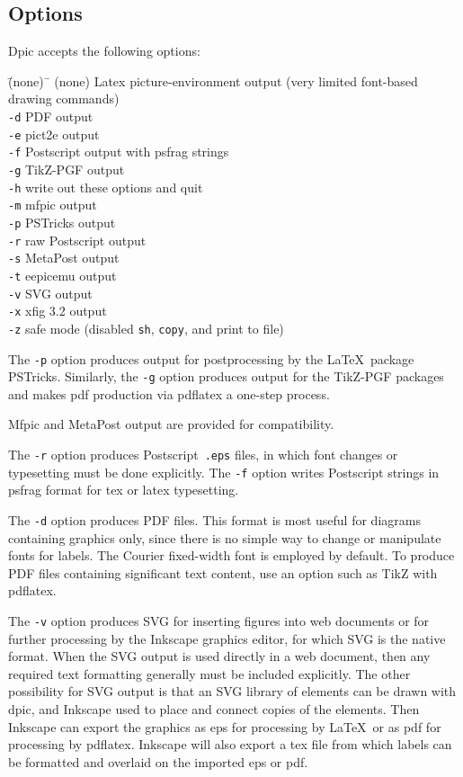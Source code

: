 \documentclass[11pt]{article}
\newcommand{\bq}{}
\newcommand{\Dpic}{{\bq Dpic}\xspace}
\newcommand{\PSTricks}{{\bq PSTricks}\xspace}
\newcommand{\MetaPost}{{\bq MetaPost}\xspace}
\newcommand{\Postscript}{{\bq Postscript}\xspace}
\begin{document}
\subsection{Options}
\Dpic accepts the following options:
\begin{tabbing}
\quad\=\hbox{(none)\ }\= \kill
\> (none) \> Latex picture-environment output (very limited font-based
 drawing commands)\\
\> {\tt -d} \> PDF output \\
\> {\tt -e} \> pict2e output \\
\> {\tt -f} \> Postscript output with psfrag strings \\
\> {\tt -g} \> TikZ-PGF output \\
\> {\tt -h} \> write out these options and quit \\
\> {\tt -m} \> mfpic output \\
\> {\tt -p} \> PSTricks output \\
\> {\tt -r} \> raw Postscript output \\
\> {\tt -s} \> MetaPost output \\
\> {\tt -t} \> eepicemu output \\
\> {\tt -v} \> SVG output \\
\> {\tt -x} \> xfig 3.2 output \\
\> {\tt -z} \> safe mode (disabled {\tt sh}, {\tt copy}, and print to file)
\end{tabbing}

The {\tt -p} option produces output for postprocessing by the
\LaTeX\ package \PSTricks.
Similarly, the {\tt -g} option produces output
for the TikZ-PGF packages and makes pdf production
via pdflatex a one-step process.

Mfpic and \MetaPost output are provided for
compatibility.

The {\tt -r} option produces \Postscript\ {\tt .eps}
files, in which font changes or typesetting must be done explicitly.
The {\tt -f} option writes \Postscript strings in psfrag
format for tex or latex typesetting.

The {\tt -d} option produces PDF files.
This format is most useful for diagrams containing graphics only, since
there is no simple way to change or manipulate fonts for labels.
The Courier fixed-width font is employed by default.
To produce PDF files containing significant text content,
use an option such as TikZ with pdflatex.

The {\tt -v} option produces SVG for inserting figures into web documents or for
further processing by the Inkscape graphics editor, for which SVG is the
native format.
When the SVG output is used directly in a web document,
then any required text formatting generally must be included explicitly.
The other possibility for SVG output is that an SVG library of elements
can be drawn with dpic, and Inkscape used to place and connect copies
of the elements.  Then Inkscape can export the graphics as eps for
processing by \LaTeX\ or as pdf for processing by pdflatex.  Inkscape
will also export a tex file from which labels can be formatted and
overlaid on the imported eps or pdf.
\end{document}
